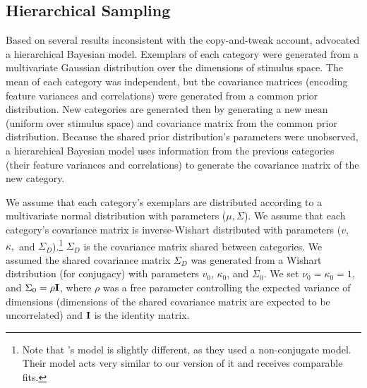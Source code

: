 \documentclass[10pt,letterpaper]{article}
\begin{document}
\subsection{Hierarchical Sampling}

Based on several results inconsistent with the copy-and-tweak account, \citet{jern2013probabilistic} advocated a hierarchical Bayesian model. Exemplars of each category were generated from a multivariate Gaussian distribution over the dimensions of stimulus space. The mean of each category was independent, but the covariance matrices (encoding feature variances and correlations) were generated from a common prior distribution. New categories are generated then by generating a new mean (uniform over stimulus space) and covariance matrix from the common prior distribution. Because the shared prior distribution's parameters were unobserved, a hierarchical Bayesian model uses information from the previous categories (their feature variances and correlations) to generate the covariance matrix of the new category.

We assume that each category's exemplars are distributed according to a multivariate normal distribution with parameters ($\mu, \Sigma$). We assume that each category's covariance matrix is inverse-Wishart distributed with parameters ($v$, $\kappa,$ and $\Sigma_D$).\footnote{Note that \citet{jern2013probabilistic}'s model is slightly different, as they used a non-conjugate model. Their model acts very similar to our version of it and receives comparable fits.} $\Sigma_D$ is the covariance matrix shared between categories. We assumed the shared covariance matrix $\Sigma_D$ was generated from a Wishart distribution (for conjugacy) with parameters $v_0$, $\kappa_0$, and $\Sigma_0$. We set $\nu_0 = \kappa_0 = 1$, and $\Sigma_0 = \rho {\bf I}$, where $\rho$ was a free parameter controlling the expected variance of dimensions (dimensions of the shared covariance matrix are expected to be uncorrelated) and ${\bf I}$ is the identity matrix.
\end{document}
